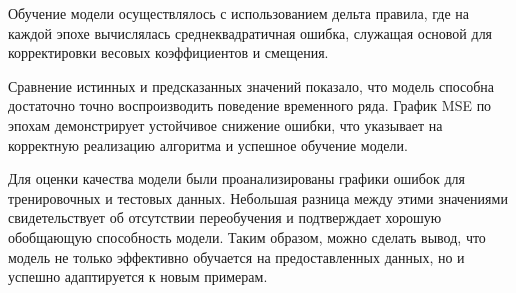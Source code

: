 \documentclass{article}%
\begin{document}
\begin{flushleft}%
Обучение модели осуществлялось с использованием дельта правила, где на каждой эпохе вычислялась среднеквадратичная ошибка, служащая основой для корректировки весовых коэффициентов и смещения.%
%
\end{flushleft}%
\begin{flushleft}%
Сравнение истинных и предсказанных значений показало, что модель способна достаточно точно воспроизводить поведение временного ряда. График MSE по эпохам демонстрирует устойчивое снижение ошибки, что указывает на корректную реализацию алгоритма и успешное обучение модели.%
%
\end{flushleft}%
\begin{flushleft}%
Для оценки качества модели были проанализированы графики ошибок для тренировочных и тестовых данных. Небольшая разница между этими значениями свидетельствует об отсутствии переобучения и подтверждает хорошую обобщающую способность модели. Таким образом, можно сделать вывод, что модель не только эффективно обучается на предоставленных данных, но и успешно адаптируется к новым примерам.%
%
\end{flushleft}%
\end{document}
